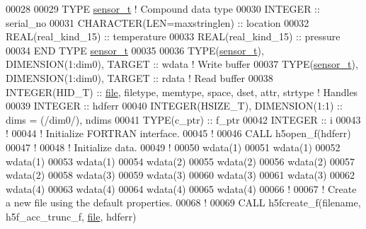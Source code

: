\begin{DoxyCode}
00028 
00029   \textcolor{keyword}{TYPE} \hyperlink{structsensor__t}{sensor\_t} \textcolor{comment}{! Compound data type}
00030      \textcolor{keywordtype}{INTEGER} :: serial\_no
00031      \textcolor{keywordtype}{CHARACTER(LEN=maxstringlen)} :: location
00032      \textcolor{keywordtype}{REAL(real\_kind\_15)} :: temperature
00033      \textcolor{keywordtype}{REAL(real\_kind\_15)} :: pressure
00034 \textcolor{keyword}{  END TYPE }\hyperlink{structsensor__t}{sensor\_t}
00035 
00036   \textcolor{keywordtype}{TYPE}(\hyperlink{structsensor__t}{sensor\_t}), \textcolor{keywordtype}{DIMENSION(1:dim0)}, \textcolor{keywordtype}{TARGET} ::  wdata \textcolor{comment}{! Write buffer}
00037   \textcolor{keywordtype}{TYPE}(\hyperlink{structsensor__t}{sensor\_t}), \textcolor{keywordtype}{DIMENSION(1:dim0)}, \textcolor{keywordtype}{TARGET} ::  rdata \textcolor{comment}{! Read buffer}
00038   \textcolor{keywordtype}{INTEGER(HID\_T)}  :: \hyperlink{structfile}{file}, filetype, memtype, space, dset, attr, strtype \textcolor{comment}{! Handles}
00039   \textcolor{keywordtype}{INTEGER} :: hdferr
00040   \textcolor{keywordtype}{INTEGER(HSIZE\_T)}, \textcolor{keywordtype}{DIMENSION(1:1)}   :: dims = (/dim0/), ndims
00041   \textcolor{keywordtype}{TYPE}(c\_ptr) :: f\_ptr
00042   \textcolor{keywordtype}{INTEGER} :: i
00043   \textcolor{comment}{!}
00044   \textcolor{comment}{! Initialize FORTRAN interface.}
00045   \textcolor{comment}{!}
00046   \textcolor{keyword}{CALL }h5open\_f(hdferr)
00047   \textcolor{comment}{!}
00048   \textcolor{comment}{! Initialize data.}
00049   \textcolor{comment}{!}
00050   wdata(1)%
00051   wdata(1)%
00052   wdata(1)%
00053   wdata(1)%
00054   wdata(2)%
00055   wdata(2)%
00056   wdata(2)%
00057   wdata(2)%
00058   wdata(3)%
00059   wdata(3)%
00060   wdata(3)%
00061   wdata(3)%
00062   wdata(4)%
00063   wdata(4)%
00064   wdata(4)%
00065   wdata(4)%
00066   \textcolor{comment}{!}
00067   \textcolor{comment}{! Create a new file using the default properties.}
00068   \textcolor{comment}{!}
00069   \textcolor{keyword}{CALL }h5fcreate\_f(filename, h5f\_acc\_trunc\_f, \hyperlink{structfile}{file}, hdferr)

\end{DoxyCode}
